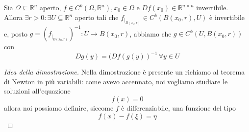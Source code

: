 \documentclass[openany, italian]{book}
\begin{document}
\begin{theorem}
Sia $\Omega \subseteq \mathbb{R}^n$ aperto, $f \in C^k(\Omega, \mathbb{R}^n), x_0 \in \Omega$ e $Df(x_0) \in \mathbb{R}^{n \times n}$ invertibile. \\
Allora $\exists r > 0: \exists U \subseteq \mathbb{R}^n$ aperto tali che $f_{|_{B(x_0, r)}} \in C^{k}(B(x_0, r), U)$ è invertibile e, posto $g=(f_{|_{B(x_0, r)}})^{-1}:U \to B(x_0, r)$, abbiamo che
$g \in C^k(U, B(x_0, r))$ con
$$
Dg(y) = (Df(g(y))^{-1} \, \forall y \in U
$$
\begin{proof}[Idea della dimostrazione]
Nella dimostrazione è presente un richiamo al teorema di Newton in più variabili: come avevo accennato, noi vogliamo studiare le soluzioni all'equazione 
$$
f(x) = 0
$$
allora noi possiamo definire, siccome $f$ è differenziabile, una funzione del tipo
$$
f(x) - f(\xi) = \eta
$$
\end{proof}

\end{theorem}
\end{document}
